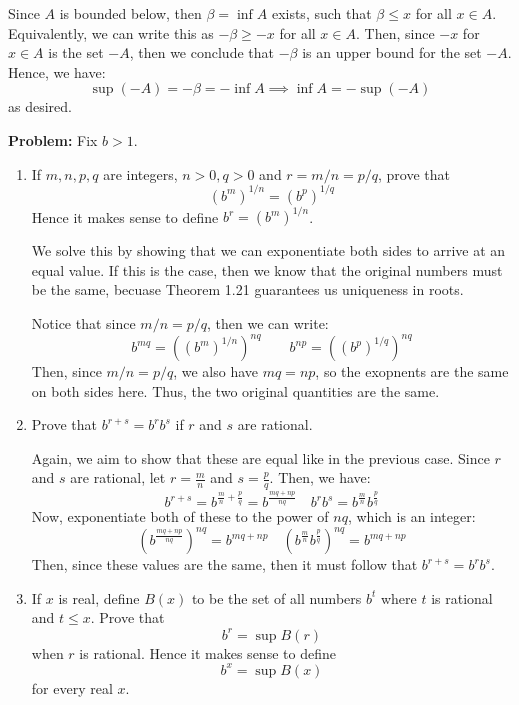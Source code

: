 \documentclass[10pt]{article}
\newenvironment{problem}{\textbf{Problem:}}{}
\begin{document}
	\begin{solution}
		Since \( A \) is bounded below, then \( \beta = \inf A \) exists, such that \( \beta \le  x \) for all 
		\( x \in A \). Equivalently, we can write this as \( -\beta \ge -x \) for all \( x \in A \). Then, since 
		\( -x \) for \( x \in A \) is the set \( -A \), then we conclude that \( -\beta \) is an upper bound 
		for the set \( -A \). Hence, we have:
		\[
		\sup(-A) = - \beta = - \inf A \implies \inf A = - \sup (-A)
		\] 
		as desired. 
	\end{solution}
	\begin{problem}
		Fix \( b > 1 \). 
		\begin{enumerate}[label=\alph*)]
			\item If \( m, n, p, q \) are integers, \( n >0, q > 0 \) and \( r = m / n = p / q \), prove that 
				\[
					(b^{m})^{1 / n} = (b^{p})^{1 / q}
				\] 
				Hence it makes sense to define \( b^{r} = (b^{m})^{1 / n} \). 

				\begin{solution}
					We solve this by showing that we can exponentiate both sides to arrive at an equal value. If this 
					is the case, then we know that the original numbers must be the same, becuase Theorem 1.21
					guarantees us uniqueness in roots. 

					Notice that since \( m / n = p / q \), then we can write:
					\[
					b^{mq}	= \left(  (b^{m})^{1 / n}\right)^{n q}\quad \quad
						b^{np} = \left( (b^{p})^{1 / q} \right)^{nq} 
					\] 
					Then, since \( m / n = p / q \), we also have \( mq = np \), so the exopnents are the same 
					on both sides here. Thus, the two original quantities are the same. 
				\end{solution}
			\item Prove that \( b^{r + s} = b^{r} b^{s} \) if \( r \) and \( s \) are rational. 

				\begin{solution}
					Again, we aim to show that these are equal like in the previous case. Since \( r \) and \( 
					s\) are rational, let \( r = \frac{m}{n} \) and \( s = \frac{p}{q} \). Then, we have:
					\[
					b^{r + s} = b^{\frac{m}{n} + \frac{p}{q}} = b^{\frac{mq + np}{nq}}\quad 
					b^{r}b^{s} = b^{\frac{m}{n}}b^{\frac{p}{q}} 
					\]  
					Now, exponentiate both of these to the power of \( nq \), which is an integer:
					\[
						(b^{\frac{mq + np}{nq}})^{nq} = b^{mq + np} \quad \left(b^{\frac{m}{n}} b^{\frac{p}{q}}\right)
						^{nq} = b^{mq + np}
					\] 
					Then, since these values are the same, then it must follow that \( b^{r + s} = b^{r} b^{s} \). 
				\end{solution}
			\item If \( x \) is real, define \( B(x) \) to be the set of all numbers \( b^{t} \) where \( t \) 
				is rational and \( t \le x \). Prove that 
				\[
				b^{r} = \sup B(r)
				\] 
				when \( r \) is rational. Hence it makes sense to define 
				 \[
				b^{x} = \sup B(x)
				\] 
				for every real \( x \).


\end{enumerate}
\end{problem}
\end{document}
